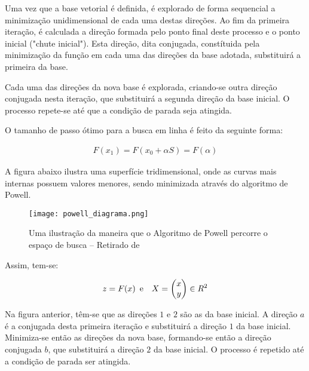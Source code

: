 \documentclass{article}
\begin{document}
Uma vez que a base vetorial é definida, é explorado de forma sequencial a minimização unidimensional de cada uma destas direções. Ao fim da primeira iteração, é calculada a direção formada pelo ponto
final deste processo e o ponto inicial ("chute inicial"). Esta direção, dita conjugada,
constítuida pela minimização da função em cada uma das direções da base adotada,
substituirá a primeira da base. \newline

Cada uma das direções da nova base é explorada, criando-se outra direção conjugada nesta iteração, que substituirá a segunda direção da base inicial. O processo repete-se até que a condição de parada seja atingida. \newline

O tamanho de passo ótimo para a busca em linha é feito da seguinte forma:

\begin{equation}
\begin{split}
F(x_1) = F(x_0 + \alpha S) = F(\alpha)
\end{split}
\end{equation}

A figura abaixo ilustra uma superfície tridimensional, onde as curvas mais internas possuem valores menores, sendo
minimizada através do algoritmo de Powell.

\begin{figure}[H]
  \centering
  \texttt{[image: powell\_diagrama.png]}
  \caption{Uma ilustração da maneira que o Algoritmo de Powell percorre o espaço de busca -- Retirado de \cite{fletcher1964function}}
\end{figure}

Assim, tem-se:

\begin{equation}
\begin{split}
z = F(x) \text{\phantom{0}e\phantom{0}}\phantom{0}
X = 
\begin{pmatrix}
x
\\ 
y
\end{pmatrix} \in R^2
\end{split}
\end{equation}

Na figura anterior, têm-se que as direções $1$ e $2$ são as da base inicial. A direção $a$ é a conjugada desta primeira iteração e substituirá a direção $1$ da base inicial. Minimiza-se então as direções da nova base, formando-se então a direção conjugada $b$, que substituirá a direção $2$ da base inicial. O processo é repetido até a condição de parada ser atingida.
\end{document}
